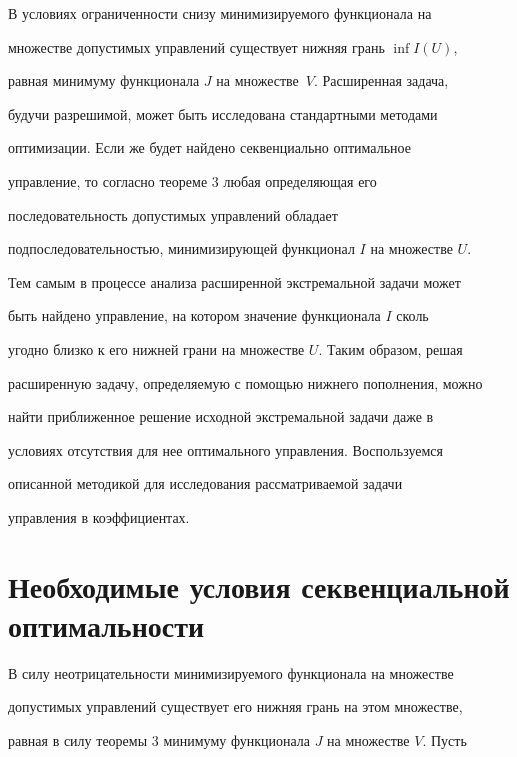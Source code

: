  


В условиях ограниченности снизу минимизируемого функционала на 


множестве допустимых управлений существует нижняя грань $\inf I(U)$, 


равная минимуму функционала $J$ на множестве~$V$. Расширенная задача, 


будучи разрешимой, может быть исследована стандартными методами 


оптимизации. Если же будет найдено секвенциально оптимальное 


управление, то согласно теореме 3 любая определяющая его 


последовательность допустимых управлений обладает 


подпоследовательностью, минимизирующей функционал $I$ на множестве $U$. 


Тем самым в процессе анализа расширенной экстремальной задачи может 


быть найдено управление, на котором значение функционала $I$ сколь 


угодно близко к его нижней грани на множестве $U$. Таким образом, решая 


расширенную задачу, определяемую с помощью нижнего пополнения, можно 


найти приближенное решение исходной экстремальной задачи даже в 


условиях отсутствия для нее оптимального управления. Воспользуемся 


описанной методикой для исследования рассматриваемой задачи 


управления в коэффициентах. 


 


 


 


\section{Необходимые условия секвенциальной оптимальности} 


 


В силу неотрицательности минимизируемого функционала на множестве 


допустимых управлений существует его нижняя грань на этом множестве, 


равная в силу теоремы 3 минимуму функционала $J$ на множестве $V$. Пусть 


